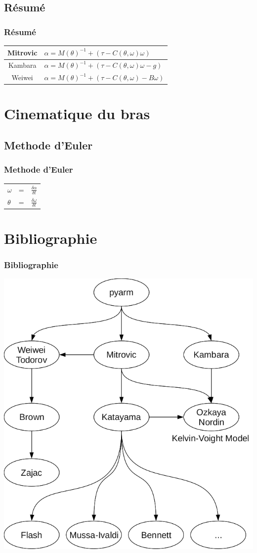 \documentclass{beamer}
\begin{document}
\subsection{Résumé}

\begin{frame}
\frametitle{Résumé}
\begin{tabular}{|c|l|}
    \hline
    Mitrovic  & $\alpha = M(\theta)^{-1} + (\tau - C(\theta, \omega) \omega)$ \\
    \hline
    Kambara  & $\alpha = M(\theta)^{-1} + (\tau - C(\theta, \omega) \omega - g)$ \\
    \hline
    Weiwei  & $\alpha = M(\theta)^{-1} + (\tau - C(\theta, \omega) - B\omega)$ \\
    \hline
\end{tabular}
\end{frame}


\section{Cinematique du bras}

\subsection{Methode d'Euler}

\begin{frame}
\frametitle{Methode d'Euler}
\begin{tabular}{lcl}
    $\omega$ & = & $\frac{\delta \alpha}{\delta t}$ \\
    $\theta$ & = & $\frac{\delta \omega}{\delta t}$ \\
\end{tabular}
\end{frame}
    

\section{Bibliographie}

\begin{frame}
\frametitle{Bibliographie}
\begin{center}
        \includegraphics[width=.80\linewidth]{fig/bib}
\end{center}
\end{frame}
\end{document}
